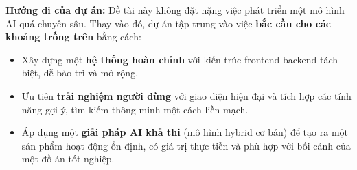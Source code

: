 \textbf{Hướng đi của dự án:} Đề tài này không đặt nặng việc phát triển một mô hình AI quá chuyên sâu. Thay vào đó, dự án tập trung vào việc \textbf{bắc cầu cho các khoảng trống trên} bằng cách:
\begin{itemize}
    \item Xây dựng một \textbf{hệ thống hoàn chỉnh} với kiến trúc frontend-backend tách biệt, dễ bảo trì và mở rộng.
    \item Ưu tiên \textbf{trải nghiệm người dùng} với giao diện hiện đại và tích hợp các tính năng gợi ý, tìm kiếm thông minh một cách liền mạch.
    \item Áp dụng một \textbf{giải pháp AI khả thi} (mô hình hybrid cơ bản) để tạo ra một sản phẩm hoạt động ổn định, có giá trị thực tiễn và phù hợp với bối cảnh của một đồ án tốt nghiệp.
\end{itemize}
